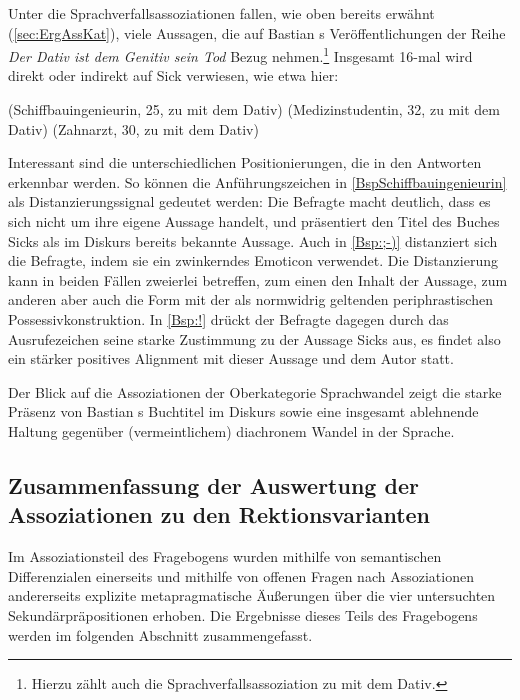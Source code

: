 Unter die Sprachverfallsassoziationen fallen, wie oben bereits erwähnt (\autoref{sec:ErgAssKat}), viele Aussagen, die auf Bastian \citeauthor{Sick2006}s Veröffentlichungen der Reihe \textit{Der Dativ ist dem Genitiv sein Tod} Bezug nehmen.\footnote{Hierzu zählt auch die Sprachverfallsassoziation zu \gegenueber{} mit dem Dativ.}
Insgesamt 16-mal wird direkt oder indirekt auf Sick verwiesen, wie etwa hier:
\begin{exe}
\ex {} (Schiffbauingenieurin, 25, zu \wegen{} mit dem Dativ)\label{BspSchiffbauingenieurin}
\ex {} (Medizinstudentin, 32, zu \waehrend{} mit dem Dativ) \label{Bsp:;-)}
\ex {} (Zahnarzt, 30, zu \wegen{} mit dem Dativ)\label{Bsp:!}
\end{exe}
Interessant sind die unterschiedlichen Positionierungen, die in den Antworten erkennbar werden. 
So können die Anführungszeichen in \autoref{BspSchiffbauingenieurin} als Distanzierungssignal gedeutet werden: Die Befragte macht deutlich, dass es sich nicht um ihre eigene Aussage handelt, und präsentiert den Titel des Buches Sicks als im Diskurs bereits bekannte Aussage. 
Auch in \autoref{Bsp:;-)} distanziert sich die Befragte, indem sie ein zwinkerndes Emoticon verwendet. 
Die Distanzierung kann in beiden Fällen zweierlei betreffen, zum einen den Inhalt der Aussage, zum anderen aber auch die Form mit der als normwidrig geltenden periphrastischen Possessivkonstruktion. 
In \autoref{Bsp:!} drückt der Befragte dagegen durch das Ausrufezeichen seine starke Zustimmung zu der Aussage Sicks aus, es findet also ein stärker positives Alignment mit dieser Aussage und dem Autor statt.

Der Blick auf die Assoziationen der Oberkategorie \glqq Sprachwandel\grqq{} zeigt die starke Präsenz von Bastian \citeauthor{Sick2006}s Buchtitel im Diskurs sowie eine insgesamt ablehnende Haltung gegenüber (vermeintlichem) diachronem Wandel in der Sprache. 
\subsection{Zusammenfassung der Auswertung der Assoziationen zu den Rektionsvarianten} 
\label{sec:ZsfsgAss}
Im Assoziationsteil des Fragebogens wurden mithilfe von semantischen Differenzialen einerseits und mithilfe von offenen Fragen nach Assoziationen andererseits explizite metapragmatische Äußerungen über die vier untersuchten Sekundärpräpositionen erhoben. 
Die Ergebnisse dieses Teils des Fragebogens werden im folgenden Abschnitt zusammengefasst. 

